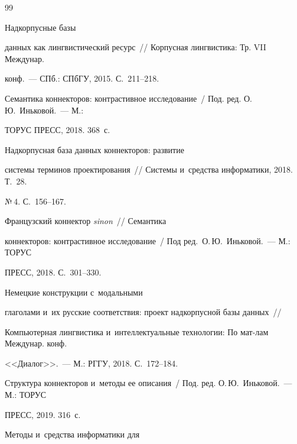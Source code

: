 {{\begin{thebibliography}{99}


 Надкорпусные базы 


данных как лингвистический ресурс~/\!\!/ Корпусная лингвистика: Тр. VII Междунар. 


конф.~--- СПб.: СПбГУ, 2015. С.~211--218.




Семантика коннекторов: контрастивное исследование~/ Под. ред. О.\,Ю.~Иньковой.~--- М.: 


ТОРУС ПРЕСС, 2018. 368~с.




 Надкорпусная база данных коннекторов: развитие 


сис\-те\-мы терминов проектирования~/\!\!/ Сис\-те\-мы и~средства информатики, 2018. Т.~28. 


№\,4. С.~156--167.




 Французский коннектор \textit{sinon}~/\!\!/ Семантика 


коннекторов: контрастивное исследование~/ Под ред.\ О.\,Ю.~Иньковой.~--- М.: ТОРУС 


ПРЕСС, 2018. С.~301--330.







 Немецкие конструкции с~модальными 


глаголами и~их рус\-ские соответствия: проект надкорпусной базы данных~/\!\!/ 


Компьютерная лингвистика и~интеллектуальные технологии: По мат-лам Междунар. конф. 


<<Диалог>>.~--- М.: РГГУ, 2018. С.~172--184.













Структура коннекторов и~методы ее описания~/ Под. ред. О.\,Ю.~Иньковой.~--- М.: ТОРУС 


ПРЕСС, 2019. 316~с.




 Методы и~средства информатики для 



\end{thebibliography}}}
